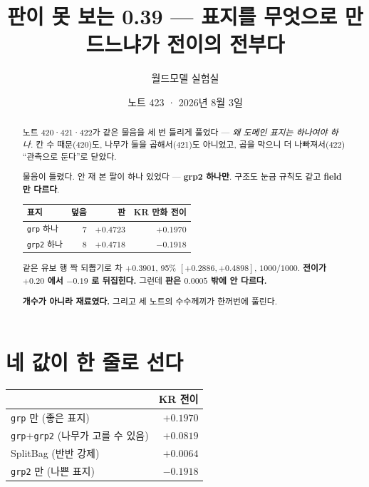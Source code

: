 \documentclass[11pt]{article}
\begin{document}
\title{판이 못 보는 0.39 --- 표지를 무엇으로 만드느냐가 전이의 전부다}
\author{월드모델 실험실}
\date{노트 423 · 2026년 8월 3일}
\maketitle

\begin{abstract}
노트 420·421·422가 같은 물음을 세 번 틀리게 풀었다 --- \emph{왜 도메인
표지는 하나여야 하나.} 칸 수 때문(420)도, 나무가 둘을 곱해서(421)도
아니었고, 곱을 막으니 더 나빠져서(422) ``관측으로 둔다''로 닫았다.

물음이 틀렸다. 안 재 본 팔이 하나 있었다 --- \textbf{grp2 하나만}.
구조도 눈금 규칙도 같고 \textbf{field 만 다르다}.

\begin{center}
\begin{tabular}{lrrr}
\hline
표지 & 덮음 & 판 & KR 만화 전이 \\
\hline
\texttt{grp} 하나 & 7 & $+0.4723$ & $\mathbf{+0.1970}$ \\
\texttt{grp2} 하나 & 8 & $+0.4718$ & $\mathbf{-0.1918}$ \\
\hline
\end{tabular}
\end{center}

같은 유보 행 짝 되뽑기로 차 $+0.3901$, 95\% $[+0.2886, +0.4898]$,
$1000/1000$. \textbf{전이가 $+0.20$ 에서 $-0.19$ 로 뒤집힌다.} 그런데
\textbf{판은 $0.0005$ 밖에 안 다르다.}

\textbf{개수가 아니라 재료였다.} 그리고 세 노트의 수수께끼가 한꺼번에 풀린다.
\end{abstract}

\section{네 값이 한 줄로 선다}

\begin{center}
\begin{tabular}{lr}
\hline
 & KR 전이 \\
\hline
\texttt{grp} 만 (좋은 표지) & $+0.1970$ \\
\texttt{grp}$+$\texttt{grp2} (나무가 고를 수 있음) & $+0.0819$ \\
SplitBag (반반 강제) & $+0.0064$ \\
\texttt{grp2} 만 (나쁜 표지) & $-0.1918$ \\
\hline
\end{tabular}
\end{center}
\end{document}
